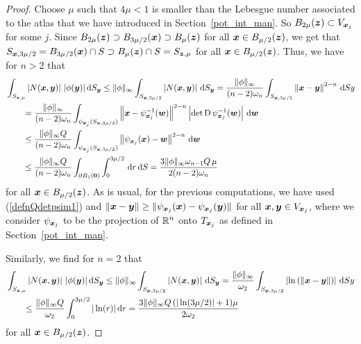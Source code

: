 \begin{proof}
 Choose $\mu$ such that $4\mu < 1$ is smaller than the Lebesgue
number associated to the atlas that we have introduced in
Section~\ref{pot_int_man}.  So $B_{2\mu}({\bm{z}}) \subset V_{{\bm{x}}_j}$
for some $j$.  Since $\displaystyle
B_{2\mu}({\bm{z}}) \supset B_{3\mu/2}({\bm{x}})
\supset B_{\mu}({\bm{z}})$ for all ${\bm{x}} \in B_{\mu/2}({\bm{z}})$, we
get that
$\displaystyle S_{{\bm{x}},3\mu/2} =  B_{3\mu/2}({\bm{x}}) \cap S
\supset B_{\mu}({\bm{z}}) \cap S = S_{{\bm{z}},\mu}$
for all ${\bm{x}} \in B_{\mu/2}({\bm{z}})$.
Thus, we have for $n>2$ that
\begin{align*}
&\int_{S_{{\bm{z}},\mu}}\left| N({\bm{x}},{\bm{y}}) \right|\,
|\phi({\bm{y}})| \,\mathrm{d}{S}_{{\bm{y}}}
\leq \|\phi\|_\infty \int_{S_{{\bm{x}},3\mu/2}} \left| N({\bm{x}},{\bm{y}}) \right|
\,\mathrm{d}{S}_{{\bm{y}}}
= \frac{\|\phi\|_\infty}{(n-2)\omega_n}
\int_{S_{{\bm{x}},3\mu/2}} \left\| {\bm{x}} - {\bm{y}}\right\|^{2-n} \,\mathrm{d}{S}{y} \\
&\qquad = \frac{\|\phi\|_\infty}{(n-2)\omega_n}
\int_{\psi_{{\bm{x}}_j}(S_{{\bm{x}},3\mu/2})}
\left\| {\bm{x}} - \psi_{{\bm{x}}_j}^{-1}({\bm{w}})\right\|^{2-n}
\left| \det \operatorname{D} \psi_{{\bm{x}}_j}^{-1}({\bm{w}}) \right| \,\mathrm{d}{{\bm{w}}} \\
&\qquad \leq \frac{\|\phi\|_\infty Q}{(n-2)\omega_n}
\int_{\psi_{{\bm{x}}_j}(S_{{\bm{x}},3\mu/2})}
\left\| \psi_{{\bm{x}}_j}({\bm{x}}) - {\bm{w}}\right \|^{2-n} \,\mathrm{d}{{\bm{w}}} \\
&\qquad \leq \frac{\|\phi\|_\infty Q}{(n-2)\omega_n}
\int_{\partial B_1({\bm{0}})} \int_0^{3\mu/2} \,\mathrm{d}{r} \,\mathrm{d}{S}
= \frac{3\|\phi\|_\infty \omega_{n-1} Q\,\mu}{2(n-2)\omega_n}
\end{align*}
for all ${\bm{x}} \in B_{\mu/2}({\bm{z}})$.  As is usual, for the
previous computations, we have used (\ref{defnQdetpsim1})
and $\displaystyle \|{\bm{x}}-{\bm{y}}\|
\geq \|\psi_{{\bm{x}}_j}({\bm{x}}) - \psi_{{\bm{x}}_j}({\bm{y}})\|$ for all
$\displaystyle {\bm{x}},{\bm{y}} \in V_{{\bm{x}}_j}$, where we consider
$\psi_{{\bm{x}}_j}$ to be the projection of $\displaystyle \mathbb{R}^n$ onto
$T_{{\bm{x}}_j}$ as defined in Section~\ref{pot_int_man}.

Similarly, we find for $n=2$ that
\begin{align*}
&\int_{S_{{\bm{z}},\mu}}\left| N({\bm{x}},{\bm{y}}) \right|\,
|\phi({\bm{y}})| \,\mathrm{d}{S}_{{\bm{y}}}
\leq \|\phi\|_\infty \int_{S_{{\bm{x}},3\mu/2}} \left| N({\bm{x}},{\bm{y}}) \right|
\,\mathrm{d}{S}_{{\bm{y}}}
= \frac{\|\phi\|_\infty}{\omega_2}
\int_{S_{{\bm{x}},3\mu/2}}
\left| \ln\left( \left\| {\bm{x}} - {\bm{y}}\right\| \right) \right| \,\mathrm{d}{S}{y} \\
&\qquad \leq \frac{\|\phi\|_\infty Q}{\omega_2} \int_0^{3\mu/2} |\ln(r)| \,\mathrm{d}{r}
= \frac{3\|\phi\|_\infty Q\,(|\ln(3\mu/2)|+1) \mu}{2\omega_2}
\end{align*}
for all ${\bm{x}} \in B_{\mu/2}({\bm{z}})$.


\end{proof}
